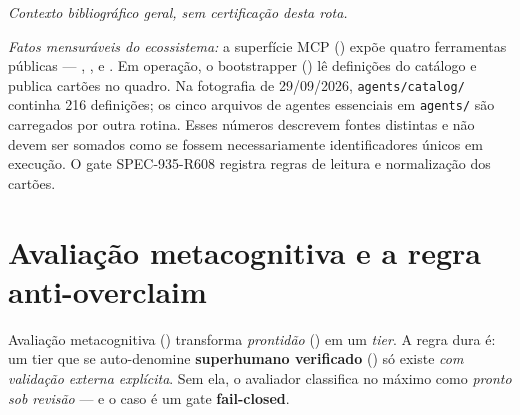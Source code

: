 \noindent\textit{Contexto bibliográfico geral, sem certificação desta rota.} 


\begin{resultado}
\emph{Fatos mensuráveis do ecossistema:} a superfície MCP
 () expõe quatro
ferramentas públicas — , ,
 e . Em operação, o
bootstrapper () lê definições do catálogo
e publica cartões no quadro. Na fotografia de 29/09/2026,
\texttt{agents/catalog/} continha 216 definições; os cinco arquivos de
agentes essenciais em \texttt{agents/} são carregados por outra rotina. Esses
números descrevem fontes distintas e não devem ser somados como se fossem
necessariamente identificadores únicos em execução. O gate SPEC-935-R608
registra regras de leitura e normalização dos cartões.
\end{resultado}

\section{Avaliação metacognitiva e a regra anti-overclaim}

\begin{conceito}
Avaliação metacognitiva () transforma
\emph{prontidão} () em um \emph{tier}. A regra dura é: um
tier que se auto-denomine \textbf{superhumano verificado} ()
só existe \emph{com validação externa explícita}. Sem ela, o avaliador
classifica no máximo como \emph{pronto sob revisão} — e o caso
 é um gate \textbf{fail-closed}.
\end{conceito}

